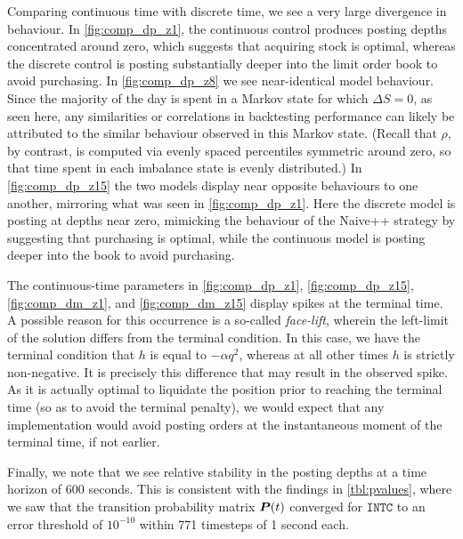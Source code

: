Comparing continuous time with discrete time, we see a very large divergence in behaviour. In \autoref{fig:comp_dp_z1}, the continuous control produces posting depths concentrated around zero, which suggests that acquiring stock is optimal, whereas the discrete control is posting substantially deeper into the limit order book to avoid purchasing. In \autoref{fig:comp_dp_z8} we see near-identical model behaviour. Since the majority of the day is spent in a Markov state for which $\Delta S = 0$, as seen here, any similarities or correlations in backtesting performance can likely be attributed to the similar behaviour observed in this Markov state. (Recall that $\rho$, by contrast, is computed via evenly spaced percentiles symmetric around zero, so that time spent in each imbalance state is evenly distributed.) In \autoref{fig:comp_dp_z15} the two models display near opposite behaviours to one another, mirroring what was seen in \autoref{fig:comp_dp_z1}. Here the discrete model is posting at depths near zero, mimicking the behaviour of the Naive++ strategy by suggesting that purchasing is optimal, while the continuous model is posting deeper into the book to avoid purchasing.

The continuous-time parameters in \autoref{fig:comp_dp_z1}, \autoref{fig:comp_dp_z15}, \autoref{fig:comp_dm_z1}, and \autoref{fig:comp_dm_z15} display spikes at the terminal time. A possible reason for this occurrence is a so-called \emph{face-lift}, wherein the left-limit of the solution differs from the terminal condition. In this case, we have the terminal condition that $h$ is equal to $-\alpha q^2$, whereas at all other times $h$ is strictly non-negative. It is precisely this difference that may result in the observed spike. As it is actually optimal to liquidate the position prior to reaching the terminal time (so as to avoid the terminal penalty), we would expect that any implementation would avoid posting orders at the instantaneous moment of the terminal time, if not earlier.

Finally, we note that we see relative stability in the posting depths at a time horizon of 600 seconds. This is consistent with the findings in \autoref{tbl:pvalues}, where we saw that the transition probability matrix $\boldsymbol{P}(t)$ converged for $\texttt{INTC}$ to an error threshold of $10^{-10}$ within 771 timesteps of 1 second each.


